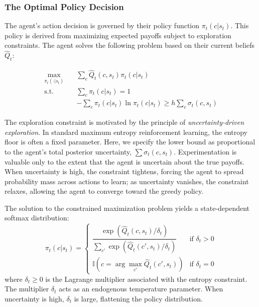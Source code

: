 \subsubsection{The Optimal Policy Decision}

The agent's action decision is governed by their policy function $\pi_t(c | s_t)$. This policy is derived from maximizing expected payoffs subject to exploration constraints. The agent solves the following problem based on their current beliefs $\hat{Q}_t$:

\begin{align}
    \max_{\pi_t(\cdot | s_t)} \quad & \sum_c \hat{Q}_t(c, s_t) \pi_t(c | s_t) \\
    \text{s.t.} \quad & \sum_c \pi_t(c | s_t) = 1 \\
    & -\sum_c \pi_t(c | s_t) \ln \pi_t(c | s_t) \geq h \sum_c \sigma_t(c, s_t) \label{eq:entropy_constraint}
\end{align}

The exploration constraint is motivated by the principle of 
\textit{uncertainty-driven exploration}. In standard maximum entropy reinforcement 
learning, the entropy floor is often a fixed parameter. Here, we specify the lower bound 
as proportional to the agent's total posterior uncertainty, $\sum \sigma_t(c, s_t)$. 
Experimentation is valuable only to the extent that the agent is uncertain about the true payoffs. 
When uncertainty is high, the constraint tightens, forcing the agent to spread 
probability mass across actions to learn; as uncertainty vanishes, the constraint 
relaxes, allowing the agent to converge toward the greedy policy.

\begin{proposition} \label{prop:optimal_policy}
    The solution to the constrained maximization problem yields a state-dependent softmax distribution:
    \begin{equation}
        \pi_t(c | s_t) = \begin{cases} 
        \dfrac{\exp\left(\hat{Q}_t(c, s_t) / \delta_t\right)}{\sum_{c'} \exp\left(\hat{Q}_t(c', s_t) / \delta_t\right)} & \text{if } \delta_t > 0 \\[3ex] 
        \mathbb{I}\left(c = \arg\max_{c'} \hat{Q}_t(c', s_t)\right) & \text{if } \delta_t = 0 
        \end{cases}
    \end{equation}
    where $\delta_t \geq 0$ is the Lagrange multiplier associated with the entropy constraint.
    The multiplier $\delta_t$ acts as an endogenous temperature parameter. When 
uncertainty is high, $\delta_t$ is large, flattening the policy distribution.
\end{proposition}

